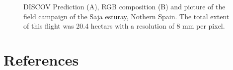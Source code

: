 \documentclass[
  letterpaper,
  DIV=11,
  numbers=noendperiod]{scrartcl}
\begin{document}
\label{cell-fig-Saja}
\begin{figure}[H]


\caption{\label{fig-Saja}DISCOV Prediction (A), RGB composition (B) and
picture of the field campaign of the Saja esturay, Nothern Spain. The
total extent of this flight was 20.4 hectars with a resolution of 8 mm
per pixel.}

\end{figure}%

\newpage

\section*{References}\label{references}
\end{document}
